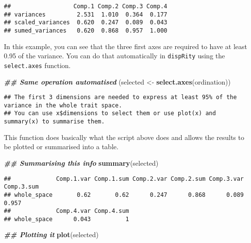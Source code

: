 \documentclass[
]{book}
\newenvironment{Shaded}{\begin{snugshade}}{\end{snugshade}}
\newcommand{\DocumentationTok}[1]{\textcolor[rgb]{0.56,0.35,0.01}{\textbf{\textit{#1}}}}
\newcommand{\FunctionTok}[1]{\textcolor[rgb]{0.13,0.29,0.53}{\textbf{#1}}}
\newcommand{\NormalTok}[1]{#1}
\newcommand{\OtherTok}[1]{\textcolor[rgb]{0.56,0.35,0.01}{#1}}
\begin{document}
\begin{verbatim}
##                  Comp.1 Comp.2 Comp.3 Comp.4
## variances         2.531  1.010  0.364  0.177
## scaled_variances  0.620  0.247  0.089  0.043
## sumed_variances   0.620  0.868  0.957  1.000
\end{verbatim}

In this example, you can see that the three first axes are required to have at least 0.95 of the variance.
You can do that automatically in \texttt{dispRity} using the \texttt{select.axes} function.

\begin{Shaded}
\begin{Highlighting}[]
\DocumentationTok{\#\# Same operation automatised}
\NormalTok{(selected }\OtherTok{\textless{}{-}} \FunctionTok{select.axes}\NormalTok{(ordination))}
\end{Highlighting}
\end{Shaded}

\begin{verbatim}
## The first 3 dimensions are needed to express at least 95% of the variance in the whole trait space.
## You can use x$dimensions to select them or use plot(x) and summary(x) to summarise them.
\end{verbatim}

This function does basically what the script above does and allows the results to be plotted or summarised into a table.

\begin{Shaded}
\begin{Highlighting}[]
\DocumentationTok{\#\# Summarising this info}
\FunctionTok{summary}\NormalTok{(selected)}
\end{Highlighting}
\end{Shaded}

\begin{verbatim}
##             Comp.1.var Comp.1.sum Comp.2.var Comp.2.sum Comp.3.var Comp.3.sum
## whole_space       0.62       0.62      0.247      0.868      0.089      0.957
##             Comp.4.var Comp.4.sum
## whole_space      0.043          1
\end{verbatim}

\begin{Shaded}
\begin{Highlighting}[]
\DocumentationTok{\#\# Plotting it}
\FunctionTok{plot}\NormalTok{(selected)}
\end{Highlighting}
\end{Shaded}
\end{document}
